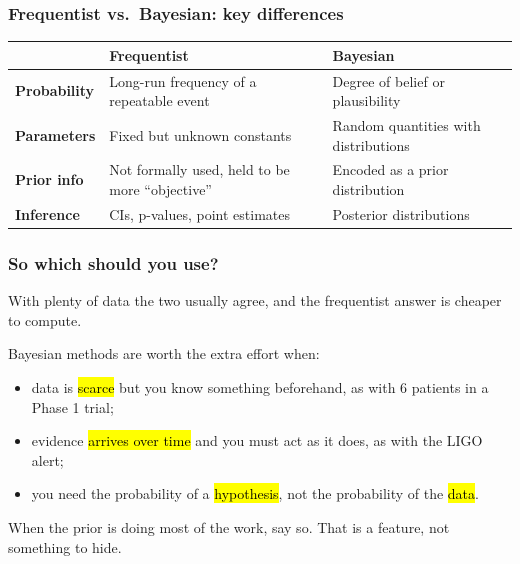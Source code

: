 \documentclass[slidestop,compress,mathserif]{beamer}
\begin{document}
\begin{frame}
\frametitle{Frequentist vs.\ Bayesian: key differences}

\renewcommand{\arraystretch}{1.3}
\begin{center}
{\small
\begin{tabular}{>{\raggedright\arraybackslash}p{2.1cm} >{\raggedright\arraybackslash}p{3.6cm} >{\raggedright\arraybackslash}p{3.6cm}}
\toprule
 & \textbf{Frequentist} & \textbf{Bayesian} \\
\midrule
\textbf{Probability} & Long-run frequency of a repeatable event & Degree of belief or plausibility \\
\textbf{Parameters} & Fixed but unknown constants & Random quantities with distributions \\
\textbf{Prior info} & Not formally used, held to be more ``objective'' & Encoded as a prior distribution \\
\textbf{Inference} & CIs, p-values, point estimates & Posterior distributions \\
\bottomrule
\end{tabular}}
\end{center}

\end{frame}

\begin{frame}
\frametitle{So which should you use?}

With plenty of data the two usually agree, and the frequentist answer is cheaper to compute.

\pause
\medskip

Bayesian methods are worth the extra effort when:
\begin{itemize}
\item data is \hl{scarce} but you know something beforehand, as with 6 patients in a Phase 1 trial;
\pause
\item evidence \hl{arrives over time} and you must act as it does, as with the LIGO alert;
\pause
\item you need the probability of a \hl{hypothesis}, not the probability of the \hl{data}.
\end{itemize}

\pause
\medskip

When the prior is doing most of the work, say so. That is a feature, not something to hide.

\end{frame}
\end{document}
